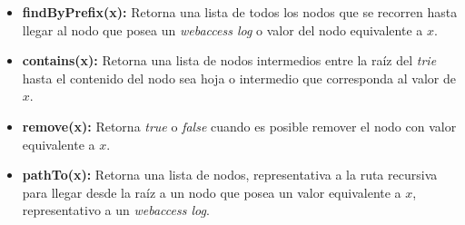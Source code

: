 \begin{itemize}	
	\menorEspacioItemize
	\item \textbf{findByPrefix(x):}  Retorna una lista de todos los nodos 	que se recorren hasta llegar al nodo que posea un \emph{webaccess log} o valor del nodo  equivalente a $x$.
	
	\item \textbf{contains(x):} Retorna una lista de nodos intermedios entre la raíz del \emph{trie} hasta el contenido del nodo sea hoja o intermedio que corresponda al valor de $x$.
	
	\item \textbf{remove(x):} Retorna \emph{true} o \emph{false} cuando es posible remover el nodo con valor equivalente a $x$.
	
	\item \textbf{pathTo(x):} Retorna una lista de nodos, representativa a la ruta recursiva para llegar desde la raíz a un nodo que posea un valor equivalente a $x$, representativo a un \emph{webaccess log}.
\end{itemize}